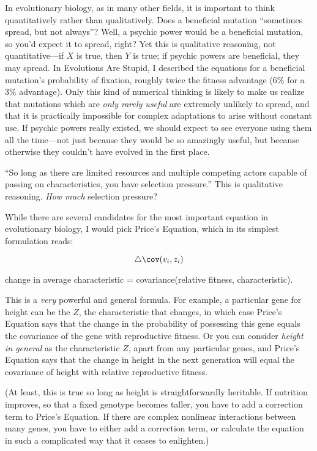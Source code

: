 {
 In evolutionary biology, as in many other fields, it is important
to think quantitatively rather than qualitatively. Does a beneficial
mutation ``sometimes spread, but not
always''? Well, a psychic power would be a beneficial
mutation, so you'd expect it to spread, right? Yet this
is qualitative reasoning, not quantitative---if $X$ is true, then $Y$ is
true; if psychic powers are beneficial, they may spread. In Evolutions
Are Stupid, I described the equations for a beneficial
mutation's probability of fixation, roughly twice the
fitness advantage (6\% for a 3\% advantage). Only this kind of
numerical thinking is likely to make us realize that mutations which
are \textit{only rarely useful} are extremely unlikely to spread, and
that it is practically impossible for complex adaptations to arise
without constant use. If psychic powers really existed, we should
expect to see everyone using them all the time---not just because they
would be so amazingly useful, but because otherwise they
couldn't have evolved in the first place.}

{
 ``So long as there are limited resources and
multiple competing actors capable of passing on characteristics, you
have selection pressure.'' This is qualitative
reasoning. \textit{How much} selection pressure?}

{
 While there are several candidates for the most important equation
in evolutionary biology, I would pick Price's Equation,
which in its simplest formulation reads:}

\begin{equation*}
  \triangle \cov(v_{i}, z_{i})
\end{equation*}


{\centering
 change in average characteristic = covariance(relative fitness,
characteristic).
\par}


\bigskip

{
 This is a \textit{very} powerful and general formula. For example,
a particular gene for height can be the $Z$, the characteristic that
changes, in which case Price's Equation says that the
change in the probability of possessing this gene equals the covariance
of the gene with reproductive fitness. Or you can consider
\textit{height in general} as the characteristic $Z$, apart from any
particular genes, and Price's Equation says that the
change in height in the next generation will equal the covariance of
height with relative reproductive fitness. }

{
 (At least, this is true so long as height is straightforwardly
heritable. If nutrition improves, so that a fixed genotype becomes
taller, you have to add a correction term to Price's
Equation. If there are complex nonlinear interactions between many
genes, you have to either add a correction term, or calculate the
equation in such a complicated way that it ceases to enlighten.)}

